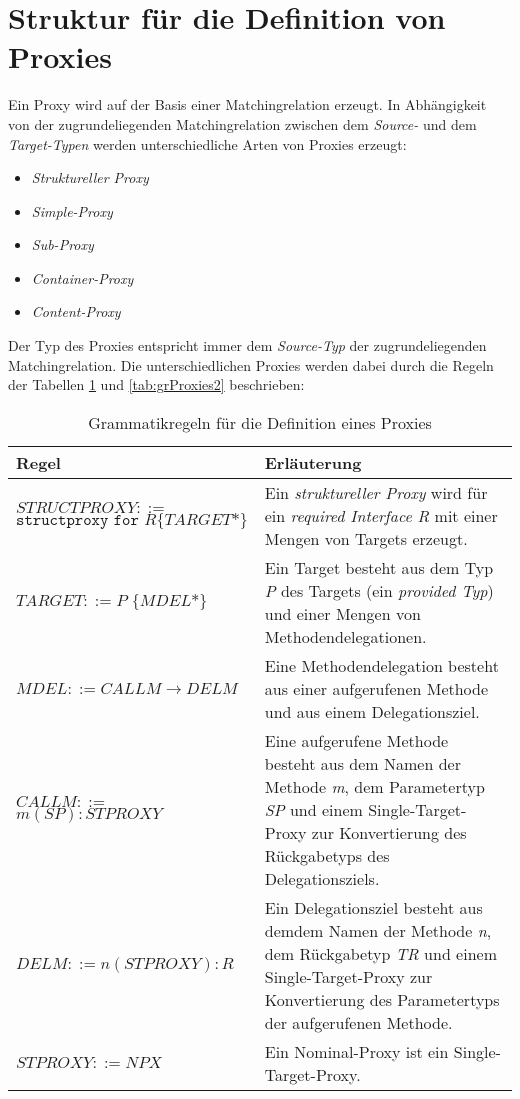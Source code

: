 \documentclass[a4paper,12pt]{article}
\begin{document}
\section{Struktur für die Definition von Proxies}
Ein Proxy wird auf der Basis einer Matchingrelation erzeugt. In Abhängigkeit von der zugrundeliegenden Matchingrelation zwischen dem \emph{Source-} und dem \emph{Target-Typen} werden unterschiedliche Arten von Proxies erzeugt:
\begin{itemize}
\item \emph{Struktureller Proxy}
\item \emph{Simple-Proxy}
\item \emph{Sub-Proxy}
\item \emph{Container-Proxy}
\item \emph{Content-Proxy}
\end{itemize}
Der Typ des Proxies entspricht immer dem \emph{Source-Typ} der zugrundeliegenden Matchingrelation. Die unterschiedlichen Proxies werden dabei durch die Regeln der Tabellen \ref{tab:grProxies1} und \ref{tab:grProxies2} beschrieben:
\begin{table}[H]
\centering
\begin{tabular}{|p{6cm}|p{8cm}|}
\hline
\hline
\centering\textbf{Regel} & \textbf{Erläuterung} \\
\hline
\hline
$\mathit{STRUCTPROXY} ::=$\newline $\texttt{structproxy } \texttt{for } R$\newline$ \texttt{\{}TARGET\text{*}\texttt{\}}$ & Ein \emph{struktureller Proxy} wird für ein \emph{required Interface R} mit einer Mengen von Targets erzeugt.  \\
\hline
$\mathit{TARGET} ::=$\newline $P \texttt{ \{}MDEL\text{*}\texttt{\}}$ & Ein Target besteht aus dem Typ \emph{P} des Targets (ein \emph{provided Typ}) und einer Mengen von Methodendelegationen.\\
\hline
$\mathit{MDEL} ::= CALLM \rightarrow DELM $  & Eine Methodendelegation besteht aus einer aufgerufenen Methode und aus einem Delegationsziel.\\
\hline
$\mathit{CALLM} ::=$\newline $m(SP):STPROXY $  & Eine aufgerufene Methode besteht aus dem Namen der Methode \emph{m}, dem Parametertyp \emph{SP} und einem Single-Target-Proxy zur Konvertierung des Rückgabetyps des Delegationsziels.\\
\hline
$\mathit{DELM} ::=$\newline $n(STPROXY):R $  & Ein Delegationsziel besteht aus demdem Namen der Methode \emph{n}, dem Rückgabetyp \emph{TR} und einem Single-Target-Proxy zur Konvertierung des Parametertyps der aufgerufenen Methode.\\
\hline
$\mathit{STPROXY} ::= NPX$ & Ein Nominal-Proxy ist ein Single-Target-Proxy.\\


\hline
\end{tabular}
\caption{Grammatikregeln für die Definition eines Proxies}
 \label{tab:grProxies1}
\end{table}
\end{document}
